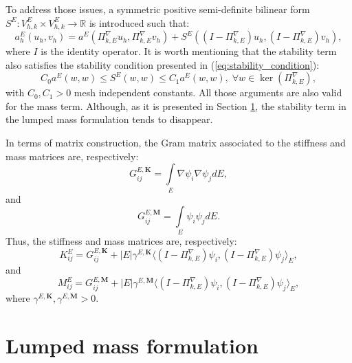 \documentclass{article}
\newcommand{\scalenergyproj}{\Pi^{\nabla}_{k,E}}
\begin{document}
To address those issues, a symmetric positive semi-definite bilinear form $S^E: V^E_{h,k} \times V^E_{h,k} \longrightarrow \mathbb{R}$ is introduced such that:
\begin{equation}\label{eq:discrete_energy_form}
    a^E_h (u_h, v_h) = a^E (\Pi^\nabla_{k,E} u_h, \Pi^\nabla_{k,E} v_h) + S^E\left( (I-\Pi^\nabla_{k,E}) u_h, (I-\Pi^\nabla_{k,E}) v_h \right),
\end{equation}
where $I$ is the identity operator. It is worth mentioning that the stability term also satisfies the stability condition presented in (\ref{eq:stability_condition}):
\begin{equation}\label{eq:stability_term_condition}
    C_0 a^E(w, w) \leq S^E(w,w) \leq C_1 a^E(w,w), \; \forall w \in \ker(\scalenergyproj),
\end{equation}
with $C_0, C_1 >0$ mesh independent constants. All those arguments are also valid for the mass term. Although, as it is presented in Section \ref{sec:lumped_mass}, the stability term in the lumped mass formulation tends to disappear. 

In terms of matrix construction, the Gram matrix associated to the stiffness and mass matrices are, respectively:
\begin{equation}\label{eq:stiffness_gram}
    G^{E,\mathbf{K}}_{ij} = \int \limits_E \nabla \psi_i \nabla \psi_j dE,
\end{equation}
and
\begin{equation}\label{eq:mass_gram}
    G^{E,\mathbf{M}}_{ij} = \int \limits_E \psi_i \psi_j dE. 
\end{equation}
Thus, the stiffness and mass matrices are, respectively:
\begin{equation}
    \nonumber
    K^E_{ij} = G^{E,\mathbf{K}}_{ij} + |E| \gamma^{E,\mathbf{K}}  \langle (I-\Pi^\nabla_{k,E})\psi_i, (I-\Pi^\nabla_{k,E})\psi_j \rangle_E,
\end{equation}
and
\begin{equation}
    \nonumber
    M^E_{ij} = G^{E,\mathbf{M}}_{ij} + |E| \gamma^{E,\mathbf{M}}  \langle (I-\Pi^\nabla_{k,E})\psi_i, (I-\Pi^\nabla_{k,E})\psi_j \rangle_E,
\end{equation}
where $\gamma^{E,\mathbf{K}}, \gamma^{E,\mathbf{M}}>0$.


\section{Lumped mass formulation}
\label{sec:lumped_mass}
\end{document}
